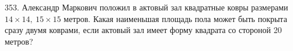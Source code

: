 353. Александр Маркович положил в актовый зал квадратные ковры размерами $14 \times 14,\ 15 \times 15$ метров. Какая наименьшая площадь пола может быть покрыта сразу двумя коврами, если актовый зал имеет форму квадрата со стороной 20 метров?\\
